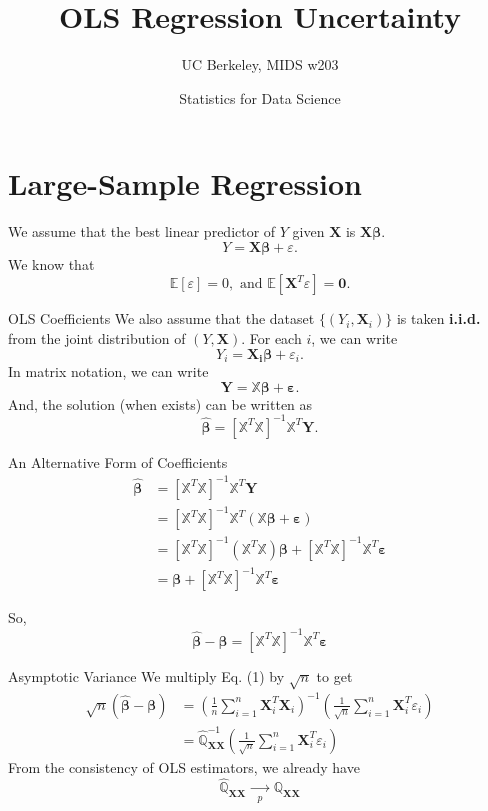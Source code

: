 \documentclass[12pt, block=fill]{beamer}
\title{OLS Regression Uncertainty}
\subtitle{UC Berkeley, MIDS w203}
\author{Statistics for Data Science}
\newcommand{\E}[1]{\mathbb{E}\left[#1\right]}
\renewcommand{\v}[1]{\pmb{#1}}
\newcommand{\m}[1]{\mathbb{#1}}
\newcommand{\eps}{\varepsilon}
\begin{document}
\maketitle

\section{Large-Sample Regression}

\begin{frame}
We assume that the best linear predictor of $Y$ given $\v{X}$ is $\v{X}\v{\beta}$.
$$
Y=\v{X}\v{\beta}+\eps.
$$
We know that
$$\E{\eps}=0,\mbox{ and }\E{\v{X}^T\eps}=\v{0}.$$

\end{frame}

\begin{frame}{OLS Coefficients}
We also assume that the dataset $\{(Y_i,\v{X}_i)\}$ is taken \textbf{i.i.d.} from the joint distribution of $(Y,\v{X})$. For each $i$, we can write
$$
Y_i=\v{X_i}\v{\beta}+\eps_i.
$$
In matrix notation, we can write
$$
\v{Y}=\m{X}\v{\beta}+\v{\eps}.
$$
And, the solution (when exists) can be written as
$$
\widehat{\v{\beta}}
=\left[\m{X}^T\m{X}\right]^{-1}\m{X}^T\v{Y}. 
$$
\end{frame} 

\begin{frame}{An Alternative Form of Coefficients}
$$
\begin{aligned}
\widehat{\v{\beta}}
&=\left[\m{X}^T\m{X}\right]^{-1}\m{X}^T\v{Y} \\
&=\left[\m{X}^T\m{X}\right]^{-1}\m{X}^T(\m{X}\v{\beta}+\v{\eps}) \\
&=\left[\m{X}^T\m{X}\right]^{-1}(\m{X}^T\m{X})\v{\beta}+
\left[\m{X}^T\m{X}\right]^{-1}\m{X}^T\v{\eps} \\
&=\v{\beta} + \left[\m{X}^T\m{X}\right]^{-1}\m{X}^T\v{\eps}
\end{aligned}
$$

So,
\begin{equation}
\widehat{\v{\beta}}-\v{\beta} = \left[\m{X}^T\m{X}\right]^{-1}\m{X}^T\v{\eps}
\end{equation}
\end{frame}

\begin{frame}{Asymptotic Variance}
We multiply Eq. (1) by $\sqrt{n}$ to get
$$
\begin{aligned}
\sqrt{n}\left(\widehat{\v{\beta}}-\v{\beta}\right)
&=\left( \frac{1}{n}\sum\limits_{i=1}^n\v{X}_i^T\v{X}_i \right)^{-1}
\left( \frac{1}{\sqrt{n}}\sum\limits_{i=1}^n\v{X}_i^T\eps_i \right) \\
&=\widehat{\m Q}_{\v{XX}}^{-1}
\left( \frac{1}{\sqrt{n}}\sum\limits_{i=1}^n\v{X}_i^T\eps_i \right)
\end{aligned}
$$
From the consistency of OLS estimators, we already have 
$$ \widehat{\m Q}_{\v{XX}}\xrightarrow[p]{\quad\quad}\m{Q}_{\v{XX}}$$
\end{frame}
\end{document}
